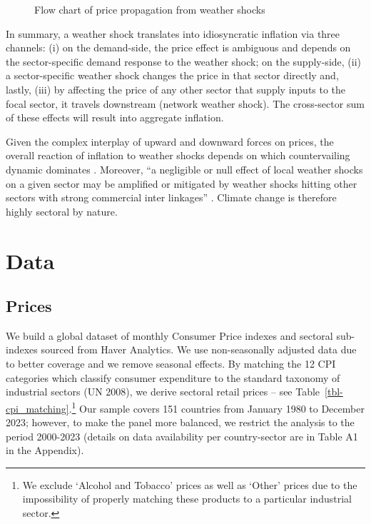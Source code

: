 \documentclass[
  letterpaper,
  DIV=11,
  numbers=noendperiod]{scrartcl}
\begin{document}
\begin{figure}[h]


\caption{\label{fig-flowchart}Flow chart of price propagation from
weather shocks}

\end{figure}%

In summary, a weather shock translates into idiosyncratic inflation via
three channels: (i) on the demand-side, the price effect is ambiguous
and depends on the sector-specific demand response to the weather shock;
on the supply-side, (ii) a sector-specific weather shock changes the
price in that sector directly and, lastly, (iii) by affecting the price
of any other sector that supply inputs to the focal sector, it travels
downstream (network weather shock). The cross-sector sum of these
effects will result into aggregate inflation.

Given the complex interplay of upward and downward forces on prices, the
overall reaction of inflation to weather shocks depends on which
countervailing dynamic dominates \citep{parker2018}. Moreover, ``a
negligible or null effect of local weather shocks on a given sector may
be amplified or mitigated by weather shocks hitting other sectors with
strong commercial inter linkages'' \citep{zappala2024}. Climate change
is therefore highly sectoral by nature.

\section{Data}\label{data}

\subsection{Prices}\label{prices}

We build a global dataset of monthly Consumer Price indexes and sectoral
sub-indexes sourced from Haver Analytics. We use non-seasonally adjusted
data due to better coverage and we remove seasonal effects. By matching
the 12 CPI categories which classify consumer expenditure to the
standard taxonomy of industrial sectors (UN 2008), we derive sectoral
retail prices -- see Table~\ref{tbl-cpi_matching}.\footnote{We exclude
  `Alcohol and Tobacco' prices as well as `Other' prices due to the
  impossibility of properly matching these products to a particular
  industrial sector.} Our sample covers 151 countries from January 1980
to December 2023; however, to make the panel more balanced, we restrict
the analysis to the period 2000-2023 (details on data availability per
country-sector are in Table A1 in the Appendix).
\end{document}
